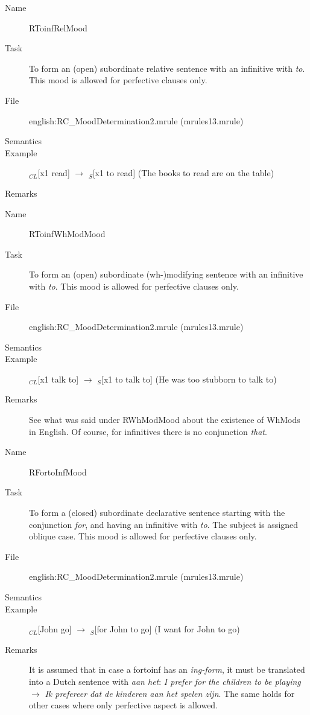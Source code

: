 \begin{description}
\vspace{1 cm}
\begin{description}
\item[Name] RToinfRelMood
\item[Task] To form an (open) subordinate relative sentence with an 
infinitive with {\em to\/}. This mood is allowed for perfective clauses only.
\item[File] english:RC\_MoodDetermination2.mrule (mrules13.mrule)
\item[Semantics]
\item[Example] $_{CL}$[x1 read] $\rightarrow$ $_S$[x1 to read] (The books to 
read are on the table)
\item[Remarks] 
\end{description}

\vspace{1 cm}
\begin{description}
\item[Name] RToinfWhModMood
\item[Task] To form an (open) subordinate (wh-)modifying sentence with an 
infinitive with {\em to\/}. This mood is allowed for perfective clauses only.
\item[File] english:RC\_MoodDetermination2.mrule (mrules13.mrule)
\item[Semantics]
\item[Example] $_{CL}$[x1 talk to] $\rightarrow$ $_S$[x1 to talk to] (He was 
too stubborn to talk to)
\item[Remarks] See what was said under RWhModMood about the existence of WhMods 
in English. Of course, for infinitives there is no conjunction {\em that\/}.
\end{description}

\vspace{1 cm}
\begin{description}
\item[Name] RFortoInfMood
\item[Task] To form a (closed) subordinate declarative sentence starting with 
the 
conjunction {\em for\/}, and having an infinitive with {\em to\/}. The subject 
is assigned oblique case. This mood is allowed for perfective clauses only.
\item[File] english:RC\_MoodDetermination2.mrule (mrules13.mrule)
\item[Semantics]
\item[Example] $_{CL}$[John go] $\rightarrow$ $_S$[for John to go] (I want for 
John to go)
\item[Remarks] It is assumed that in case a fortoinf has an {\em ing-form\/}, 
it must be translated into a Dutch sentence with {\em aan het\/}: {\em I prefer 
for the children to be playing\/} $\rightarrow$ {\em Ik prefereer dat de 
kinderen 
aan het spelen zijn\/}. The same holds for other cases where only perfective 
aspect is allowed.
\end{description}


\end{description}
